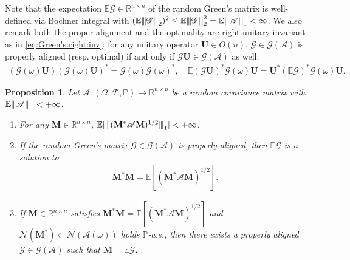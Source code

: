 \documentclass[noinfoline]{imsart}\setcounter{tocdepth}{2}
\renewcommand{\b}[1]{\mathbb{#1}} %
\newcommand{\m}[1]{\mathbf{#1}} %
\newcommand{\s}[1]{\mathscr{#1}} %
\renewcommand{\c}[1]{\mathcal{#1}} %
\newcommand{\vertiii}[1]{{\left\vert\kern-0.25ex\left\vert\kern-0.25ex\left\vert #1 
    \right\vert\kern-0.25ex\right\vert\kern-0.25ex\right\vert}} %
\newcommand{\vertii}[1]{{\vert\kern-0.25ex\vert\kern-0.25ex\vert #1 
    \vert\kern-0.25ex\vert\kern-0.25ex\vert}} %
\theoremstyle{plain}
\newtheorem{proposition}[theorem]{Proposition}
\begin{document}
Note that the expectation $\b{E} \s{G} \in \b{R}^{n \times n}$ of the random Green's matrix is well-defined via Bochner integral with $(\b{E} \vertii{\s{G}}_{2})^{2} \le \b{E} \vertii{\s{G}}_{2}^{2} = \b{E} \vertii{\s{A}}_{1} < \infty$. 
We also remark both the proper alignment and the optimality are right unitary invariant as in \eqref{eq:Green's:right:inv}: for any unitary operator $\m{U} \in O(n)$, $\s{G} \in \c{G}(\s{A})$ is properly aligned (resp. optimal) if and only if $\s{G} \m{U} \in \c{G}(\s{A})$ as well:
\begin{align}\label{eq:opt:align:unitary}
    (\s{G}(\omega) \m{U}) (\s{G}(\omega) \m{U})^{*} = \s{G}(\omega) \s{G}(\omega)^{*}, \quad
    \b{E}(\s{G} \m{U})^{*} \s{G}(\omega) \m{U} = \m{U}^{*} (\b{E} \s{G})^{*} \s{G}(\omega) \m{U}.
\end{align}

\begin{proposition}\label{cor:bary:eq:sol}
Let $\s{A}: (\Omega, \s{F}, \b{P}) \to \b{R}^{n \times n}$ be a random covariance matrix with $\b{E} \vertiii{\s{A}}_{1} < +\infty$.
\begin{enumerate}[leftmargin = *]
\item For any $\m{M} \in \b{R}^{n \times n}$, $\b{E} [\vertii{(\m{M}^{*} \s{A} \m{M})^{1/2}}_{1}] < + \infty$.
\item If the random Green's matrix $\s{G} \in \c{G}(\s{A})$ is properly aligned, then $\b{E} \s{G}$ is a solution to
\begin{align}\label{eq:Knott:eqn}
    \m{M}^{*} \m{M} = \b{E} [(\m{M}^{*} \s{A} \m{M})^{1/2}].
\end{align}
\item If $\m{M} \in \b{R}^{n \times n}$ satisfies $\m{M}^{*} \m{M} = \b{E} [(\m{M}^{*} \s{A} \m{M})^{1/2}]$ and $\c{N}(\m{M}^{*}) \subset \c{N}(\s{A}(\omega))$ holds $\b{P}$-a.s., then there exists a properly aligned $\s{G} \in \c{G}(\s{A})$ such that $\m{M} = \b{E} \s{G}$. 
\end{enumerate}
\end{proposition}
\end{document}
